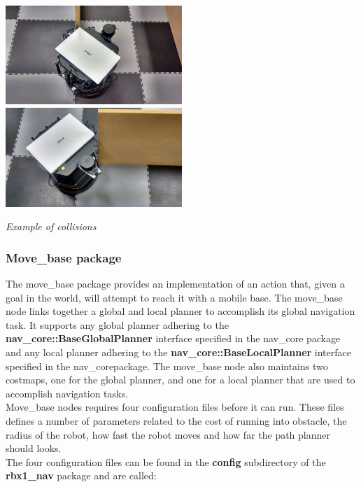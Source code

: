 \documentclass[10pt,a4paper]{article}
\begin{document}
\includegraphics[width=0.5\textwidth]{images/turtlebotCollision1.jpg}
\includegraphics[width=0.5\textwidth]{images/turtlebotCollision3.jpg}
\\

\begin{center}
\textit{Example of collisions}
\end{center}

\subsubsection{Move\_base package}

The move\_base package provides an implementation of an action that, given a goal in the world, will attempt to reach it with a mobile base. The move\_base node links together a global and local planner to accomplish its global navigation task. It supports any global planner adhering to the \textbf{nav\_core::BaseGlobalPlanner} interface specified in the nav\_core package and any local planner adhering to the \textbf{nav\_core::BaseLocalPlanner} interface specified in the nav\_corepackage. The move\_base node also maintains two costmaps, one for the global planner, and one for a local planner that are used to accomplish navigation tasks.\\

Move\_base nodes requires four configuration files before it can run. These files defines a number of parameters related to the cost of running into obstacle, the radius of the robot, how fast the robot moves and how far the path planner should looks. \\

The four configuration files can be found in the \textbf{config} subdirectory of the \textbf{rbx1\_nav} package and are called: 
\end{document}
